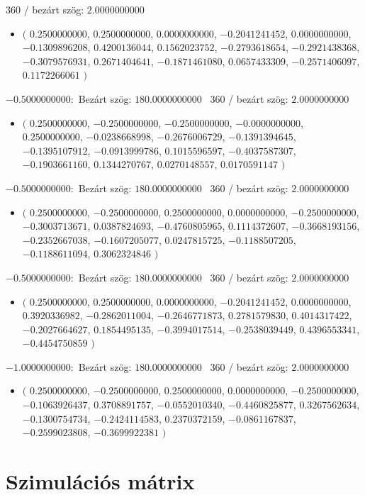 \documentclass[14pt,a4paper]{article}
\begin{document}
360 / bezárt szög: $2.0000000000$\
\begin{itemize}
\item
$\big($
$0.2500000000$, $0.2500000000$, $0.0000000000$, $-0.2041241452$, $0.0000000000$, $-0.1309896208$, $0.4200136044$, $0.1562023752$, $-0.2793618654$, $-0.2921438368$, $-0.3079576931$, $0.2671404641$, $-0.1871461080$, $0.0657433309$, $-0.2571406097$, $0.1172266061$
$\big)$
\end{itemize}
$-0.5000000000$:\
Bezárt szög: $180.0000000000$ \
360 / bezárt szög: $2.0000000000$\
\begin{itemize}
\item
$\big($
$0.2500000000$, $-0.2500000000$, $-0.2500000000$, $-0.0000000000$, $0.2500000000$, $-0.0238668998$, $-0.2676006729$, $-0.1391394645$, $-0.1395107912$, $-0.0913999786$, $0.1015596597$, $-0.4037587307$, $-0.1903661160$, $0.1344270767$, $0.0270148557$, $0.0170591147$
$\big)$
\end{itemize}
$-0.5000000000$:\
Bezárt szög: $180.0000000000$ \
360 / bezárt szög: $2.0000000000$\
\begin{itemize}
\item
$\big($
$0.2500000000$, $-0.2500000000$, $0.2500000000$, $0.0000000000$, $-0.2500000000$, $-0.3003713671$, $0.0387824693$, $-0.4760805965$, $0.1114372607$, $-0.3668193156$, $-0.2352667038$, $-0.1607205077$, $0.0247815725$, $-0.1188507205$, $-0.1188611094$, $0.3062324846$
$\big)$
\end{itemize}
$-0.5000000000$:\
Bezárt szög: $180.0000000000$ \
360 / bezárt szög: $2.0000000000$\
\begin{itemize}
\item
$\big($
$0.2500000000$, $0.2500000000$, $0.0000000000$, $-0.2041241452$, $0.0000000000$, $0.3920336982$, $-0.2862011004$, $-0.2646771873$, $0.2781579830$, $0.4014317422$, $-0.2027664627$, $0.1854495135$, $-0.3994017514$, $-0.2538039449$, $0.4396553341$, $-0.4454750859$
$\big)$
\end{itemize}
$-1.0000000000$:\
Bezárt szög: $180.0000000000$ \
360 / bezárt szög: $2.0000000000$\
\begin{itemize}
\item
$\big($
$0.2500000000$, $-0.2500000000$, $0.2500000000$, $0.0000000000$, $-0.2500000000$, $-0.1063926437$, $0.3708891757$, $-0.0552010340$, $-0.4460825877$, $0.3267562634$, $-0.1300754734$, $-0.2424114583$, $0.2370372159$, $-0.0861167837$, $-0.2599023808$, $-0.3699922381$
$\big)$
\end{itemize}
\section{Szimulációs mátrix}
\end{document}

